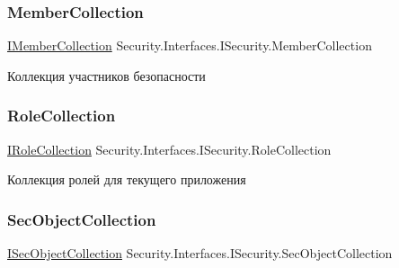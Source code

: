 \subsubsection{\texorpdfstring{Member\+Collection}{MemberCollection}}
{\footnotesize\ttfamily \hyperlink{interface_security_1_1_interfaces_1_1_collections_1_1_i_member_collection}{I\+Member\+Collection} Security.\+Interfaces.\+I\+Security.\+Member\+Collection\hspace{0.3cm}{\ttfamily [get]}}



Коллекция участников безопасности 

\mbox{\label{interface_security_1_1_interfaces_1_1_i_security_add16f9e37b6c62ebf8ba2b547de93834}} 
\subsubsection{\texorpdfstring{Role\+Collection}{RoleCollection}}
{\footnotesize\ttfamily \hyperlink{interface_security_1_1_interfaces_1_1_collections_1_1_i_role_collection}{I\+Role\+Collection} Security.\+Interfaces.\+I\+Security.\+Role\+Collection\hspace{0.3cm}{\ttfamily [get]}}



Коллекция ролей для текущего приложения 

\mbox{\label{interface_security_1_1_interfaces_1_1_i_security_a5fabf1db303fcb912908cf6519471204}} 
\subsubsection{\texorpdfstring{Sec\+Object\+Collection}{SecObjectCollection}}
{\footnotesize\ttfamily \hyperlink{interface_security_1_1_interfaces_1_1_collections_1_1_i_sec_object_collection}{I\+Sec\+Object\+Collection} Security.\+Interfaces.\+I\+Security.\+Sec\+Object\+Collection\hspace{0.3cm}{\ttfamily [get]}}



